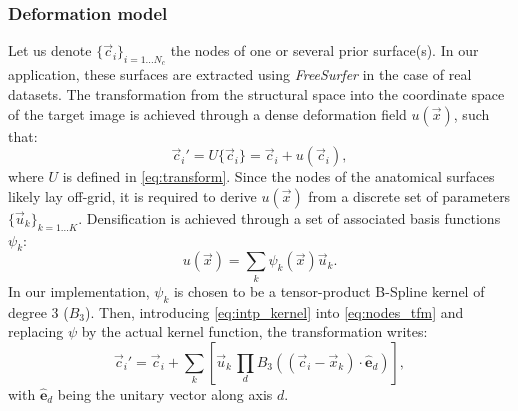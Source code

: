 \subsubsection{Deformation model}
\label{sec:deformation_model}
Let us denote $\{\vec{c}_i\}_{i=1 \ldots N_c}$ the nodes of one or several prior
  surface(s).
In our application, these surfaces are extracted using \emph{FreeSurfer}
  \citep{fischl_freesurfer_2012} in the case of real datasets.
The transformation from the structural space into the coordinate space of the
  target image is achieved through a dense deformation field $u(\vec{x})$, such that:
  \begin{equation}
  \vec{c}_i' = U\{\vec{c}_i\} = \vec{c}_i + u(\vec{c}_i),
  \label{eq:nodes_tfm}
  \end{equation}
  where $U$ is defined in \eqref{eq:transform}.
Since the nodes of the anatomical surfaces likely lay off-grid, it is required to
  derive $u(\vec{x})$ from a discrete set of parameters $\{\vec{u}_k\}_{k=1 \ldots K}$.
Densification is achieved through a set of associated basis functions $\psi_k$:
  \begin{equation}
  u(\vec{x}) = \sum_k \psi_k(\vec{x}) \vec{u}_k.
  \label{eq:intp_kernel}
  \end{equation}
%
In our implementation, $\psi_k$ is chosen to be a tensor-product B-Spline kernel
  of degree 3 ($B_3$).
Then, introducing \eqref{eq:intp_kernel} into \eqref{eq:nodes_tfm} and replacing
  $\psi$ by the actual kernel function, the transformation writes:
  \begin{equation}
    \vec{c}_i' = \vec{c}_i + \sum_k \left[ \vec{u}_k \, \underset{d}{\prod}
      B_3( (\vec{c}_i - \vec{x}_k) \cdot \hat{\mathbf{e}}_d ) \right],
  \label{eq:transformation}
  \end{equation}
  with $\hat{\mathbf{e}}_d$ being the unitary vector along axis $d$.


